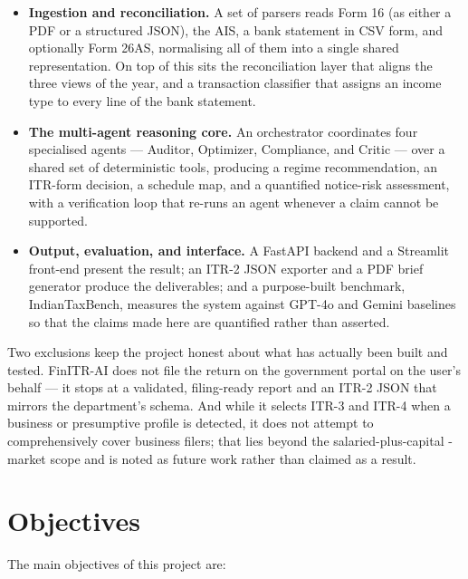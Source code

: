 \begin{itemize}
    \item \textbf{Ingestion and reconciliation.} A set of parsers reads Form 16
          (as either a PDF or a structured JSON), the AIS, a bank statement in
          CSV form, and optionally Form 26AS, normalising all of them into a
          single shared representation. On top of this sits the reconciliation
          layer that aligns the three views of the year, and a transaction
          classifier that assigns an income type to every line of the bank
          statement.
    \item \textbf{The multi-agent reasoning core.} An orchestrator coordinates
          four specialised agents --- Auditor, Optimizer, Compliance, and Critic
          --- over a shared set of deterministic tools, producing a regime
          recommendation, an ITR-form decision, a schedule map, and a quantified
          notice-risk assessment, with a verification loop that re-runs an agent
          whenever a claim cannot be supported.
    \item \textbf{Output, evaluation, and interface.} A FastAPI backend and a
          Streamlit front-end present the result; an ITR-2 JSON exporter and a
          PDF brief generator produce the deliverables; and a purpose-built
          benchmark, IndianTaxBench, measures the system against GPT-4o and
          Gemini baselines so that the claims made here are quantified rather
          than asserted.
\end{itemize}

Two exclusions keep the project honest about what has actually been built and
tested. FinITR-AI does not file the return on the government portal on the
user's behalf --- it stops at a validated, filing-ready report and an ITR-2 JSON
that mirrors the department's schema. And while it selects ITR-3 and ITR-4 when
a business or presumptive profile is detected, it does not attempt to
comprehensively cover business filers; that lies beyond the salaried-plus-capital
-market scope and is noted as future work rather than claimed as a result.

\section{Objectives}
\label{sec:objectives}

The main objectives of this project are:


